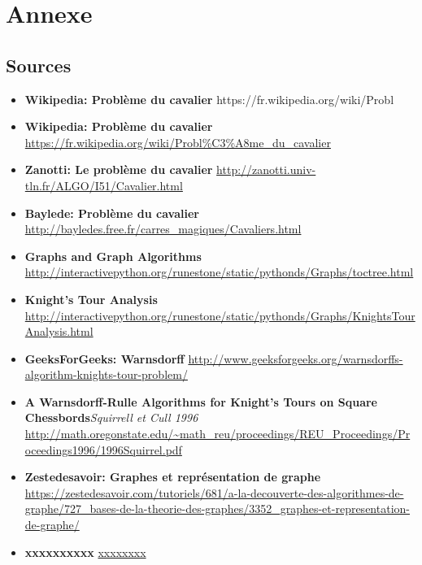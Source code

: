 \section{Annexe}

\subsection{Sources}
\begin{itemize}
  \item \textbf{Wikipedia: Problème du cavalier} https://fr.wikipedia.org/wiki/Probl%
    \item \textbf{Wikipedia: Problème du cavalier} \url{https://fr.wikipedia.org/wiki/Probl%C3%A8me_du_cavalier}
	\item \textbf{Zanotti: Le problème du cavalier} \url{http://zanotti.univ-tln.fr/ALGO/I51/Cavalier.html}
	\item \textbf{Baylede: Problème du cavalier} \url{http://bayledes.free.fr/carres_magiques/Cavaliers.html}
	\item \textbf{Graphs and Graph Algorithms} \url{http://interactivepython.org/runestone/static/pythonds/Graphs/toctree.html}
	\item \textbf{Knight’s Tour Analysis} \url{http://interactivepython.org/runestone/static/pythonds/Graphs/KnightsTourAnalysis.html}
	\item \textbf{GeeksForGeeks: Warnsdorff} \url{http://www.geeksforgeeks.org/warnsdorffs-algorithm-knights-tour-problem/}
	\item \textbf{A Warnsdorff-Rulle Algorithms for Knight’s Tours on Square Chessbords}\textit{Squirrell et Cull 1996} \url{http://math.oregonstate.edu/~math_reu/proceedings/REU_Proceedings/Proceedings1996/1996Squirrel.pdf}
	\item \textbf{Zestedesavoir: Graphes et représentation de graphe} \url{https://zestedesavoir.com/tutoriels/681/a-la-decouverte-des-algorithmes-de-graphe/727_bases-de-la-theorie-des-graphes/3352_graphes-et-representation-de-graphe/}
	\item \textbf{xxxxxxxxxx} \url{xxxxxxxx}

\end{itemize}
